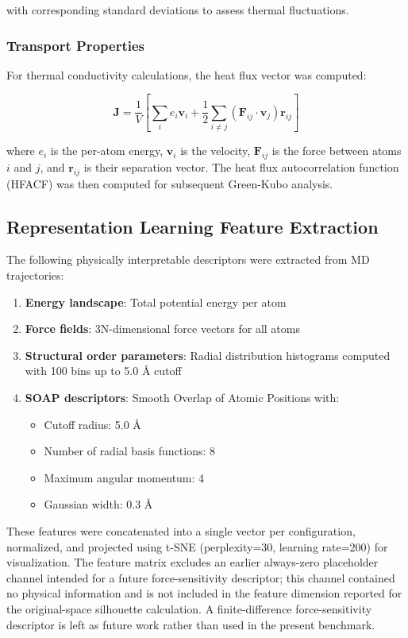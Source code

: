 \documentclass[pdflatex,sn-mathphys-num]{sn-jnl}%
\providecommand{\reviewermap}[3]{}
\theoremstyle{thmstyleone}%
\theoremstyle{thmstyletwo}%
\theoremstyle{thmstylethree}%
\begin{document}
with corresponding standard deviations to assess thermal fluctuations.

\subsubsection{Transport Properties}

For thermal conductivity calculations, the heat flux vector was computed:

\begin{equation}
\mathbf{J} = \frac{1}{V} \left[ \sum_i e_i \mathbf{v}_i + \frac{1}{2} \sum_{i \neq j} (\mathbf{F}_{ij} \cdot \mathbf{v}_j) \mathbf{r}_{ij} \right]
\end{equation}

where $e_i$ is the per-atom energy, $\mathbf{v}_i$ is the velocity, $\mathbf{F}_{ij}$ is the force between atoms $i$ and $j$, and $\mathbf{r}_{ij}$ is their separation vector. The heat flux autocorrelation function (HFACF) was then computed for subsequent Green-Kubo analysis.

\subsection{Representation Learning Feature Extraction}
The following physically interpretable descriptors were extracted from MD trajectories:
\begin{enumerate}
\item \textbf{Energy landscape}: Total potential energy per atom
\item \textbf{Force fields}: 3N-dimensional force vectors for all atoms
\item \textbf{Structural order parameters}: Radial distribution histograms computed with 100 bins up to 5.0 \AA{} cutoff
\item \textbf{SOAP descriptors}: Smooth Overlap of Atomic Positions with:
  \begin{itemize}
  \item Cutoff radius: 5.0 \AA
  \item Number of radial basis functions: 8
  \item Maximum angular momentum: 4
  \item Gaussian width: 0.3 \AA
  \end{itemize}
\reviewermap{REV-C12}{done-local}{The previous always-zero force-sensitivity placeholder channel was removed from the feature matrix.}
\end{enumerate}

These features were concatenated into a single vector per configuration, normalized, and projected using t-SNE (perplexity=30, learning rate=200) for visualization. The feature matrix excludes an earlier always-zero placeholder channel intended for a future force-sensitivity descriptor; this channel contained no physical information and is not included in the feature dimension reported for the original-space silhouette calculation. A finite-difference force-sensitivity descriptor is left as future work rather than used in the present benchmark.
\end{document}
